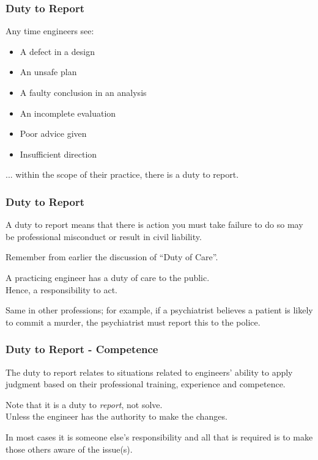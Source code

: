 \begin{frame}
\frametitle{Duty to Report}

Any time engineers see:
\begin{itemize}
	\item A defect in a design 
	\item An unsafe plan
	\item A faulty conclusion in an analysis
	\item An incomplete evaluation
	\item Poor advice given 
	\item Insufficient direction
\end{itemize}

... within the scope of their practice, there is a duty to report.

\end{frame}



\begin{frame}
\frametitle{Duty to Report}

A duty to report means that there is action you must take failure to do so may be professional misconduct or result in civil liability.

Remember from earlier the discussion of ``Duty of Care''.

A practicing engineer has a duty of care to the public.\\
\quad Hence, a responsibility to act.

Same in other professions; for example, if a psychiatrist believes a patient is likely to commit a murder, the psychiatrist must report this to the police.

\end{frame}



\begin{frame}
\frametitle{Duty to Report - Competence}

The duty to report relates to situations related to engineers' ability to apply judgment based on their professional training, experience and competence.

Note that it is a duty to \textit{report}, not solve.\\
\quad Unless the engineer has the authority to make the changes.

In most cases it is someone else's responsibility and all that is required is to make those others aware of the issue(s). 


\end{frame}



